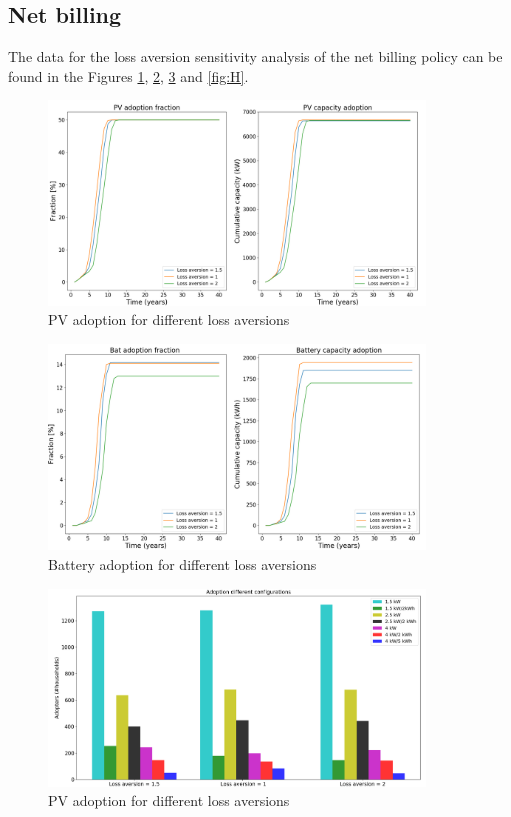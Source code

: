 \subsection{Net billing}
The data for the loss aversion sensitivity analysis of the net billing policy can be found in the Figures \ref{fig:E}, \ref{fig:F}, \ref{fig:G} and \ref{fig:H}.  
\newline 
\begin{figure}[h!]
    \centering
    \includegraphics[width=10cm]{AppendixA/PVNBloss.PNG}
    \caption{PV adoption for different loss aversions}
    \label{fig:E}
\end{figure}
\noindent
\newline 
\begin{figure}[h!]
    \centering
    \includegraphics[width=10cm]{AppendixA/BatNBloss.PNG}
    \caption{Battery adoption for different loss aversions}
    \label{fig:F}
\end{figure}
\noindent
\newline 
\begin{figure}[h!]
    \centering
    \includegraphics[width=10cm]{AppendixA/ConfigNBloss.PNG}
    \caption{PV adoption for different loss aversions}
    \label{fig:G}
\end{figure}
